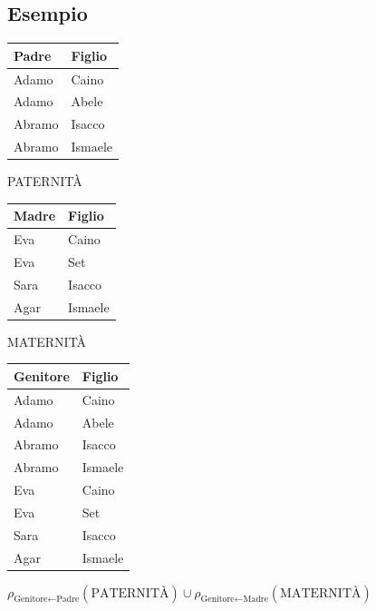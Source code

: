 \subsection{Esempio}
\begin{center}

    \begin{minipage}{0.3\textwidth}
        \centering
        \begin{tabular}{|l|l|}
        \hline
        \textbf{Padre} & \textbf{Figlio} \\ \hline
        Adamo & Caino \\ \hline
        Adamo & Abele \\ \hline
        Abramo & Isacco \\ \hline
        Abramo & Ismaele \\ \hline
        \end{tabular}
        
        \vspace{2mm}
        \small PATERNITÀ
    \end{minipage}
    \hfill
    \begin{minipage}{0.3\textwidth}
        \centering
        \begin{tabular}{|l|l|}
        \hline
        \textbf{Madre} & \textbf{Figlio} \\ \hline
        Eva & Caino \\ \hline
        Eva & Set \\ \hline
        Sara & Isacco \\ \hline
        Agar & Ismaele \\ \hline
        \end{tabular}
        
        \vspace{2mm}
        \small MATERNITÀ
    \end{minipage}

    \vspace{1cm}

    \begin{tabular}{|l|l|}
    \hline
    \textbf{Genitore} & \textbf{Figlio} \\ \hline
    Adamo & Caino \\ \hline
    Adamo & Abele \\ \hline
    Abramo & Isacco \\ \hline
    Abramo & Ismaele \\ \hline
    Eva & Caino \\ \hline
    Eva & Set \\ \hline
    Sara & Isacco \\ \hline
    Agar & Ismaele \\ \hline
    \end{tabular}
    
    \vspace{3mm}
    $\rho_{\text{Genitore} \leftarrow \text{Padre}}(\text{PATERNITÀ}) \cup \rho_{\text{Genitore} \leftarrow \text{Madre}}(\text{MATERNITÀ})$

\end{center}

